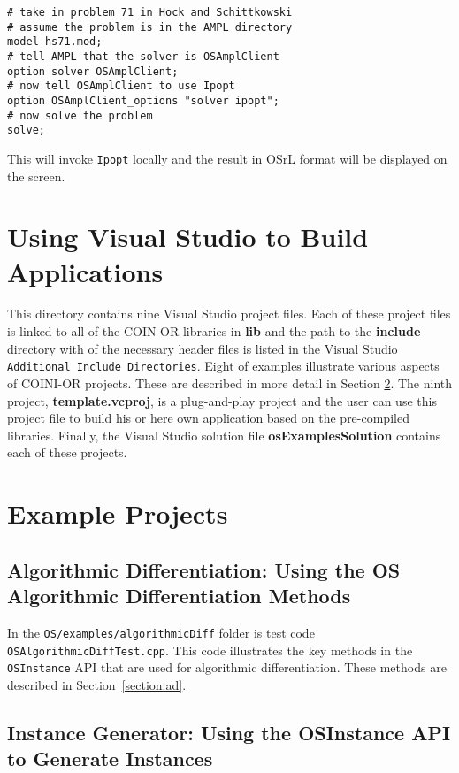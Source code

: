 \documentclass[11pt]{article}
\renewcommand{\_}{{\char"5F}}
\renewcommand{\{}{{\char"7B}}
\renewcommand{\}}{{\char"7D}}
\renewcommand{\^}{{\char"0D}}
\renewcommand{\'}{{\char"0D}}
\begin{document}
\begin{verbatim}
# take in problem 71 in Hock and Schittkowski
# assume the problem is in the AMPL directory
model hs71.mod;
# tell AMPL that the solver is OSAmplClient
option solver OSAmplClient;
# now tell OSAmplClient to use Ipopt
option OSAmplClient_options "solver ipopt";
# now solve the problem
solve;
\end{verbatim}
This will invoke {\tt Ipopt} locally and the result in OSrL format will be displayed on the screen.



\section{Using Visual Studio to Build Applications}\label{section:visualstudio} This directory contains nine Visual Studio project files.  Each of these project files is linked to all of the COIN-OR libraries in {\bf lib} and the path to the {\bf include} directory with of the necessary header files is listed in the Visual Studio {\tt Additional Include Directories}. Eight of examples illustrate various aspects of COINI-OR projects.  These are described in more detail in Section \ref{section:examples}. The ninth project,  {\bf  template.vcproj}, is  a plug-and-play project and the user can use this project file to build his or here own application based on the pre-compiled   libraries.  Finally, the Visual Studio solution file {\bf osExamplesSolution} contains each of these projects. 

\section{Example Projects}\label{section:examples}

\subsection{Algorithmic Differentiation:  Using the OS Algorithmic Differentiation Methods}\label{section:cppad}

In the {\tt OS/examples/algorithmicDiff} folder is test code {\tt OSAlgorithmicDiffTest.cpp}. This code
illustrates the key methods in the {\tt OSInstance} API that are used for
algorithmic differentiation.   These methods are described in Section~\ref{section:ad}.



\subsection{Instance Generator: Using the OSInstance API to Generate Instances}\label{section:exampleOSInstanceGeneration}
\end{document}
